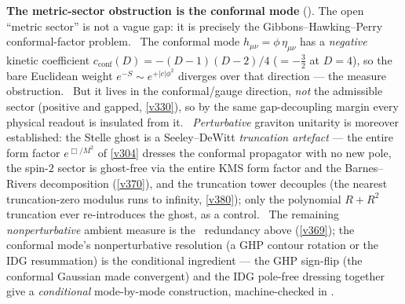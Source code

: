 \par\smallskip\noindent\textbf{The metric-sector obstruction is the conformal mode}
(). The open ``metric sector'' is not a vague gap: it is precisely the
Gibbons--Hawking--Perry conformal-factor problem. \mE\ The conformal mode $h_{\mu\nu}{=}\phi\,\eta_{\mu\nu}$ has a
\emph{negative} kinetic coefficient $c_{\mathrm{conf}}(D){=}-(D{-}1)(D{-}2)/4$ (${=}-\tfrac32$ at $D{=}4$), so the
bare Euclidean weight $e^{-S}\sim e^{+|c|\phi^2}$ diverges over that direction --- the measure obstruction. \mE\
But it lives in the conformal/gauge direction, \emph{not} the admissible sector (positive and gapped, \vref{v330}),
so by the same gap-decoupling margin every physical readout is insulated from it. \mC\ \emph{Perturbative} graviton
unitarity is moreover established: the Stelle ghost is a Seeley--DeWitt \emph{truncation artefact} --- the entire
form factor $e^{\Box/M^2}$ of \vref{v304} dresses the conformal propagator with no new pole, the spin-$2$ sector is
ghost-free via the entire KMS form factor and the Barnes--Rivers decomposition (\vref{v370}), and the truncation
tower decouples (the nearest truncation-zero modulus runs to infinity, \vref{v380}); only the polynomial
$R{+}R^2$ truncation ever re-introduces the ghost, as a control. \mC\ The remaining \emph{nonperturbative} ambient
measure is the \mC\ redundancy above (\vref{v369}); the conformal mode's nonperturbative resolution (a GHP contour
rotation or the IDG resummation) is the conditional ingredient --- the GHP sign-flip (the conformal Gaussian made
convergent) and the IDG pole-free dressing together give a \emph{conditional} mode-by-mode construction,
machine-checked in \veri{v334\_conformal\_resolution.py}.



